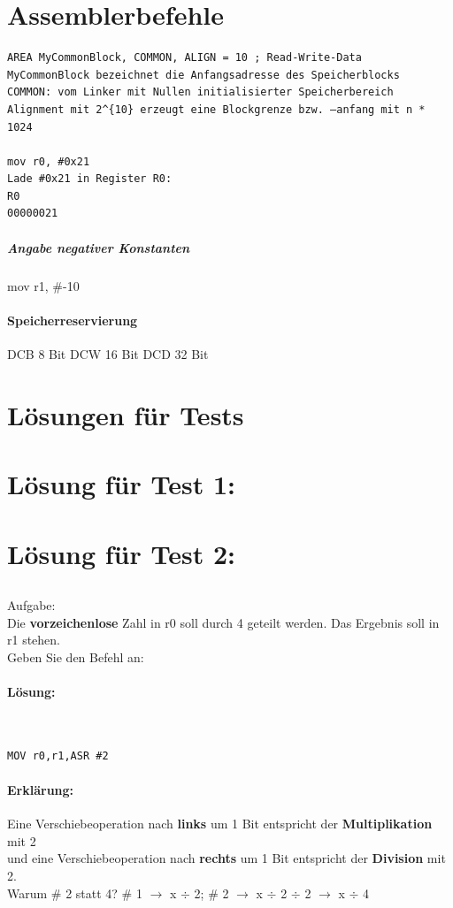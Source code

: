 \documentclass[12pt,twoside,a4paper]{article}
\begin{document}
\section*{Assemblerbefehle}
\begin{lstlisting}
AREA MyCommonBlock, COMMON, ALIGN = 10 ; Read-Write-Data
MyCommonBlock bezeichnet die Anfangsadresse des Speicherblocks
COMMON: vom Linker mit Nullen initialisierter Speicherbereich
Alignment mit 2^{10} erzeugt eine Blockgrenze bzw. –anfang mit n * 1024

mov r0, #0x21
Lade #0x21 in Register R0:
R0
00000021
\end{lstlisting} 

\subparagraph{Angabe negativer Konstanten}
mov r1, #-10

\paragraph{Speicherreservierung}
DCB  8 Bit
DCW 16 Bit
DCD 32 Bit

\newpage
\section*{Lösungen für Tests}
\section{Lösung für Test 1:}
\section{Lösung für Test 2:}
\subsection{}
Aufgabe:\\
Die \textbf{vorzeichenlose} Zahl in r0 soll durch 4 geteilt werden. Das Ergebnis soll in r1 stehen.\\
Geben Sie den Befehl an:\\


\paragraph*{Lösung:}\\

\begin{lstlisting}
MOV r0,r1,ASR #2
\end{lstlisting}


\paragraph*{Erklärung:}
Eine Verschiebeoperation nach \textbf{links} um 1 Bit entspricht der \textbf{Multiplikation} mit 2 \\
und eine Verschiebeoperation nach \textbf{rechts} um 1 Bit entspricht der \textbf{Division} mit 2. \\
Warum \# 2 statt 4? \# 1 $\rightarrow$ x $\div$ 2; \# 2 $\rightarrow$ x $\div$ 2 $\div$ 2 $\rightarrow$ x $\div$ 4 
\end{document}
